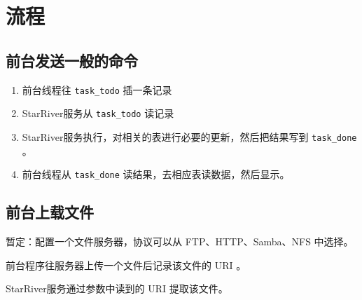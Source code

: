 \section{流程}\label{ux6d41ux7a0b}

\subsection{前台发送一般的命令}\label{ux524dux53f0ux53d1ux9001ux4e00ux822cux7684ux547dux4ee4}

\begin{enumerate}
\def\labelenumi{\arabic{enumi}.}
\itemsep1pt\parskip0pt
\item
  前台线程往 \texttt{task\_todo} 插一条记录
\item
  StarRiver服务从 \texttt{task\_todo} 读记录
\item
  StarRiver服务执行，对相关的表进行必要的更新，然后把结果写到
  \texttt{task\_done} 。
\item
  前台线程从 \texttt{task\_done} 读结果，去相应表读数据，然后显示。
\end{enumerate}

\subsection{前台上载文件}\label{ux524dux53f0ux4e0aux8f7dux6587ux4ef6}

暂定：配置一个文件服务器，协议可以从 FTP、HTTP、Samba、NFS 中选择。

前台程序往服务器上传一个文件后记录该文件的 URI 。

StarRiver服务通过参数中读到的 URI 提取该文件。
